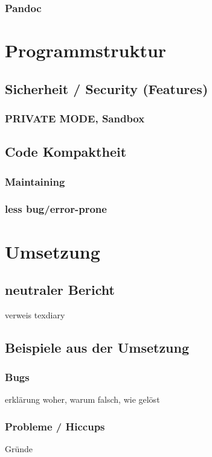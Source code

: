 \documentclass[a4paper,11pt]{article}
\begin{document}
\subsubsection{Pandoc}

\section{Programmstruktur}

\subsection{Sicherheit / Security (Features)}
\subsubsection{PRIVATE MODE, Sandbox}

\subsection{Code Kompaktheit}
\subsubsection{Maintaining}
\subsubsection{less bug/error-prone}

\section{Umsetzung}

\subsection{neutraler Bericht}
verweis texdiary
\subsection{Beispiele aus der Umsetzung}
\subsubsection{Bugs}
erklärung woher, warum falsch, wie gelöst

\subsubsection{Probleme / Hiccups}
Gründe
\end{document}
